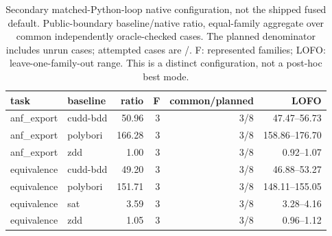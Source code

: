 \begin{table}[tbp]
\centering\scriptsize
\setlength{\tabcolsep}{3pt}
\caption{Secondary matched-Python-loop native configuration, not the shipped fused default. Public-boundary baseline/native ratio, equal-family aggregate over common independently oracle-checked cases. The planned denominator includes unrun cases; attempted cases are \QualRunCases{}/\QualCases{}. F: represented families; LOFO: leave-one-family-out range. This is a distinct configuration, not a post-hoc best mode.}
\label{tab:current-matched}
\begin{tabular}{llrrrr}
\toprule
task & baseline & ratio & F & common/planned & LOFO \\
\midrule
anf\_export & cudd-bdd & 50.96 & 3 & 3/8 & 47.47--56.73 \\
anf\_export & polybori & 166.28 & 3 & 3/8 & 158.86--176.70 \\
anf\_export & zdd & 1.00 & 3 & 3/8 & 0.92--1.07 \\
equivalence & cudd-bdd & 49.20 & 3 & 3/8 & 46.88--53.27 \\
equivalence & polybori & 151.71 & 3 & 3/8 & 148.11--155.05 \\
equivalence & sat & 3.59 & 3 & 3/8 & 3.28--4.16 \\
equivalence & zdd & 1.05 & 3 & 3/8 & 0.96--1.12 \\
\bottomrule
\end{tabular}
\end{table}
